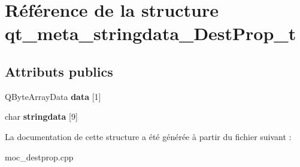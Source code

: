 \hypertarget{structqt__meta__stringdata__DestProp__t}{\section{Référence de la structure qt\+\_\+meta\+\_\+stringdata\+\_\+\+Dest\+Prop\+\_\+t}
\label{structqt__meta__stringdata__DestProp__t}
}
\subsection*{Attributs publics}
\begin{DoxyCompactItemize}
\item 
\hypertarget{structqt__meta__stringdata__DestProp__t_a15cf8f34b0ed8fdd7200b91c4b9f3369}{Q\+Byte\+Array\+Data {\bfseries data} \mbox{[}1\mbox{]}}\label{structqt__meta__stringdata__DestProp__t_a15cf8f34b0ed8fdd7200b91c4b9f3369}

\item 
\hypertarget{structqt__meta__stringdata__DestProp__t_ac8fcf98b546ea440f4090adf03c5875f}{char {\bfseries stringdata} \mbox{[}9\mbox{]}}\label{structqt__meta__stringdata__DestProp__t_ac8fcf98b546ea440f4090adf03c5875f}

\end{DoxyCompactItemize}


La documentation de cette structure a été générée à partir du fichier suivant \+:\begin{DoxyCompactItemize}
\item 
moc\+\_\+destprop.\+cpp\end{DoxyCompactItemize}
